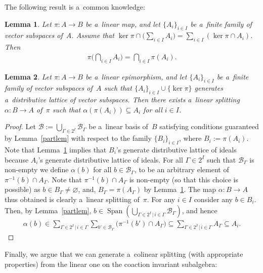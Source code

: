 \documentclass[11pt]{article}
\newtheorem{lemma}{Lemma}
\DeclareMathOperator{\Span}{Span}
\begin{document}
The following result is a~common knowledge:
\begin{lemma}
\label{common}
Let $\pi:A\rightarrow B$ be a~linear map, and let $\{A_i\}_{i\in I}$ be a~finite family of vector subspaces of~$A$.
Assume that $\ker\pi\cap\Big(\sum\limits_{i\in I}A_i\Big)=\sum\limits_{i\in I}(\ker\pi\cap A_i)$.
Then
\begin{gather*}
\pi\bigg(\bigcap_{i\in I}A_i\bigg)=\bigcap_{i\in I}\pi(A_i).
\end{gather*}
\end{lemma}

\begin{lemma}
\label{splitcoinv}
Let $\pi:A\rightarrow B$ be a~linear epimorphism, and let $\{A_i\}_{i\in I}$ be a~finite family of vector subspaces
of~$A$ such that $\{A_i\}_{i\in I}\cup\{\ker\pi\}$ generates a~distributive lattice of vector subspaces.
Then there exists a~linear splitting $\alpha:B\rightarrow A$ of~$\pi$ such that $\alpha(\pi(A_i))\subseteq A_i$ for all
$i\in I$.
\end{lemma}
\begin{proof}
Let $\mathcal{B}:=\bigcup_{\Gamma\in 2^I}\mathcal{B}_\Gamma$ be a~linear basis of~$B$ satisfying conditions guaranteed
by Lemma~\ref{partlem} with respect to the family $\{B_i\}_{i\in I}$, where $B_i:=\pi(A_i)$.
Note that Lemma~\ref{common} implies that $B_i$'s generate distributive lattice of ideals because $A_i$'s generate
distributive lattice of ideals.
For all $\Gamma\in2^I$ such that $\mathcal{B}_\Gamma$ is non-empty we def\/ine $\alpha(b)$ for all $b\in
\mathcal{B}_\Gamma$, to be an arbitrary element of $\pi^{-1}(b)\cap A_\Gamma$.
Note that $\pi^{-1}(b)\cap A_\Gamma$ is non-empty (so that this choice is possible) as $b\in B_\Gamma\neq \varnothing$,
and, $B_\Gamma=\pi(A_\Gamma)$ by Lemma~\ref{common}.
The map $\alpha:B\rightarrow A$ thus obtained is clearly a~linear splitting of~$\pi$.
For any $i\in I$ consider any $b\in B_i$.
Then, by Lemma~\ref{partlem}, $b\in\Span(\bigcup_{\Gamma\in 2^I  \, |
\,
i\in\Gamma}\mathcal{B}_\Gamma)$, and hence
\begin{gather*}
\alpha(b)\in\sum\limits_{\Gamma\in 2^I
\,
|
\,
i\in\Gamma}\sum\limits_{b'\in \mathcal{B}_\Gamma}\big(\pi^{-1}(b')\cap A_\Gamma\big) \subseteq\sum\limits_{\Gamma\in
2^I
\,
|
\,
i\in\Gamma}A_\Gamma\subseteq A_i.\tag*{\qed}
\end{gather*}
\renewcommand{\qed}{}
\end{proof}

Finally, we argue that we can generate a~colinear splitting (with appropriate properties) from the linear one on the
coaction invariant subalgebra:
\end{document}

